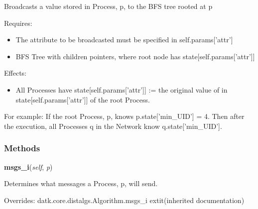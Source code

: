 Broadcasts a value stored in Process, p, to the BFS tree rooted at p

Requires:

\begin{itemize}
\setlength{\parskip}{0.6ex}
  \item The attribute to be broadcasted must be specified in 
    self.params['attr']

  \item BFS Tree with children pointers, where root node has 
    state[self.params['attr']]

\end{itemize}

Effects:

\begin{itemize}
\setlength{\parskip}{0.6ex}
  \item All Processes have state[self.params['attr']] := the original value of 
    in state[self.params['attr']] of the root Process.

\end{itemize}

For example: If the root Process, p, knows p.state['min\_UID'] = 4. Then 
after the execution, all Processes q in the Network know 
q.state['min\_UID'].



  \subsubsection{Methods}

    \vspace{0.5ex}

\hspace{.8\funcindent}\begin{boxedminipage}{\funcwidth}

    \raggedright \textbf{msgs\_i}(\textit{self}, \textit{p})

\setlength{\parskip}{2ex}
    Determines what messages a Process, p, will send.

\setlength{\parskip}{1ex}
      Overrides: datk.core.distalgs.Algorithm.msgs\_i 	extit{(inherited documentation)}

    \end{boxedminipage}

    \vspace{0.5ex}

